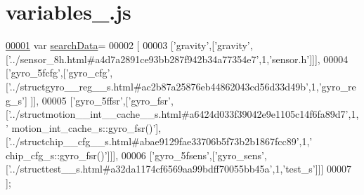 \hypertarget{variables__7_8js_source}{}\section{variables\+\_.\+js}
\label{variables__7_8js_source}

\begin{DoxyCode}
\hypertarget{variables__7_8js_source.tex_l00001}{}\hyperlink{variables__7_8js_ad01a7523f103d6242ef9b0451861231e}{00001} var \hyperlink{variables__7_8js_ad01a7523f103d6242ef9b0451861231e}{searchData}=
00002 [
00003   [\textcolor{stringliteral}{'gravity'},[\textcolor{stringliteral}{'gravity'},[\textcolor{stringliteral}{'../sensor\_8h.html#a4d7a2891ce93bb287f942b34a77354e7'},1,\textcolor{stringliteral}{'sensor.h'}]]],
00004   [\textcolor{stringliteral}{'gyro\_5fcfg'},[\textcolor{stringliteral}{'gyro\_cfg'},[\textcolor{stringliteral}{'../structgyro\_\_reg\_\_s.html#ac2b87a25876eb44862043cd56d33d49b'},1,\textcolor{stringliteral}{'gyro\_reg\_s'}]
      ]],
00005   [\textcolor{stringliteral}{'gyro\_5ffsr'},[\textcolor{stringliteral}{'gyro\_fsr'},[\textcolor{stringliteral}{'../structmotion\_\_int\_\_cache\_\_s.html#a6424d033f39042e9e1105c14f6fa89d7'},1,\textcolor{stringliteral}{'
      motion\_int\_cache\_s::gyro\_fsr()'}],[\textcolor{stringliteral}{'../structchip\_\_cfg\_\_s.html#abae9129fae33706b5f73b2b1867fcc89'},1,\textcolor{stringliteral}{'
      chip\_cfg\_s::gyro\_fsr()'}]]],
00006   [\textcolor{stringliteral}{'gyro\_5fsens'},[\textcolor{stringliteral}{'gyro\_sens'},[\textcolor{stringliteral}{'../structtest\_\_s.html#a32da1174cf6569aa99bdff70055bb45a'},1,\textcolor{stringliteral}{'test\_s'}]]]
00007 ];
\end{DoxyCode}
